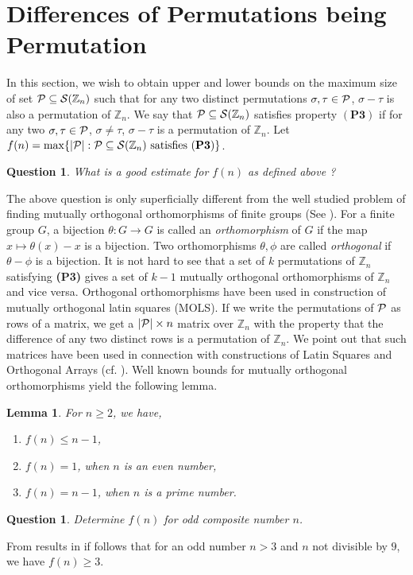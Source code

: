 \documentclass[12pt]{article}
\newcommand{\Zn}{\mathbb{Z}_n}
\newcommand{\PsZn}{{\cal S}(\Zn)}
\newtheorem{lemma}[defn]{{\bf Lemma}}
\newtheorem{qn}[defn]{{\bf Question}}
\begin{document}
\section{Differences of Permutations being Permutation}\label{sec:ortho}
In this section, we wish to obtain upper and lower bounds on the maximum size of
set ${\cal P}\subseteq \PsZn$ such that for any two distinct permutations
$\sigma,\tau \in {\cal P}$, $\sigma-\tau$ is also a permutation of $\Zn$.
We say that ${\cal P}\subseteq \PsZn$ satisfies property $\mathbf{(P3)}$ if
for any two $\sigma,\tau\in {\cal P}$, $\sigma\neq \tau$, $\sigma-\tau$ is
a permutation of $\Zn$. Let $f(n) = \max\{|{\cal P}|: {\cal P}\subseteq
\PsZn \text{
satisfies } \mathbf{(P3)}\}$. 
\begin{qn}{\rm
What is a good estimate for $f(n)$ as defined above ?
}
\end{qn}
The above question is only superficially different from the well studied
problem of finding mutually orthogonal orthomorphisms of finite groups (See
\cite{evan1}). For
a finite group $G$, a bijection $\theta:G\rightarrow G$ is called an {\em
orthomorphism} of $G$ if the map $x\mapsto \theta(x)-x$ is a bijection. Two
orthomorphisms $\theta,\phi$ are called {\em orthogonal} if $\theta-\phi$
is a bijection. It is not hard to see that a set of $k$ permutations of
${\mathbb Z}_n$ satisfying {\bf (P3)} gives a set of $k-1$ mutually
orthogonal orthomorphisms
of ${\mathbb Z}_n$ and vice versa. Orthogonal orthomorphisms have been used
in construction of mutually orthogonal latin squares (MOLS). 
If we write the permutations of ${\cal P}$ as rows of a matrix,
we get a $|{\cal P}|\times n$ matrix over $\Zn$ with the property that the
difference of any two distinct rows is a permutation of $\Zn$. We point out
that such matrices have been used in connection with constructions of Latin
Squares and Orthogonal Arrays (cf. \cite[Chapter 22]{vlint}). Well known
bounds for mutually orthogonal orthomorphisms yield the following lemma.
\begin{lemma}
For $n\geq 2$, we have,
\begin{enumerate}[{\rm (a)}]
\item $f(n)\leq n-1$,
\item $f(n)=1$, when $n$ is an even number,
\item $f(n)=n-1$, when $n$ is a prime number.
\end{enumerate}
\end{lemma}

\begin{qn}{\rm
Determine $f(n)$ for odd composite number $n$.
}
\end{qn}
From results in \cite{evan1} if follows that for an odd number $n>3$ and $n$ not
divisible by $9$, we have $f(n)\geq 3$.
 
\end{document}
